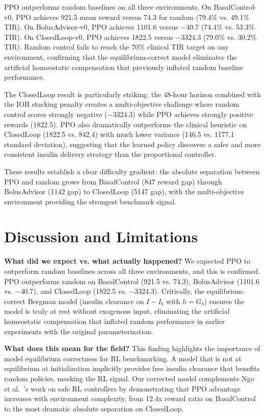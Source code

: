 \documentclass[11pt]{article}
\begin{document}
PPO outperforms random baselines on all three environments. On BasalControl-v0, PPO achieves 921.5 mean reward versus 74.3 for random (79.4\% vs. 49.1\% TIR). On BolusAdvisor-v0, PPO achieves 1101.6 versus $-$40.7 (74.4\% vs. 53.3\% TIR). On ClosedLoop-v0, PPO achieves 1822.5 versus $-$3324.3 (79.0\% vs. 30.2\% TIR). Random control fails to reach the 70\% clinical TIR target on any environment, confirming that the equilibrium-correct model eliminates the artificial homeostatic compensation that previously inflated random baseline performance.

The ClosedLoop result is particularly striking: the 48-hour horizon combined with the IOB stacking penalty creates a multi-objective challenge where random control scores strongly negative ($-$3324.3) while PPO achieves strongly positive rewards (1822.5). PPO also dramatically outperforms the clinical heuristic on ClosedLoop (1822.5 vs. 842.4) with much lower variance (146.5 vs. 1177.1 standard deviation), suggesting that the learned policy discovers a safer and more consistent insulin delivery strategy than the proportional controller.

These results establish a clear difficulty gradient: the absolute separation between PPO and random grows from BasalControl (847 reward gap) through BolusAdvisor (1142 gap) to ClosedLoop (5147 gap), with the multi-objective environment providing the strongest benchmark signal.

\section{Discussion and Limitations}

\textbf{What did we expect vs. what actually happened?}
We expected PPO to outperform random baselines across all three environments, and this is confirmed. PPO outperforms random on BasalControl (921.5 vs. 74.3), BolusAdvisor (1101.6 vs. $-$40.7), and ClosedLoop (1822.5 vs. $-$3324.3). Critically, the equilibrium-correct Bergman model (insulin clearance on $I - I_b$ with $h = G_b$) ensures the model is truly at rest without exogenous input, eliminating the artificial homeostatic compensation that inflated random performance in earlier experiments with the original parameterization.

\textbf{What does this mean for the field?}
This finding highlights the importance of model equilibrium correctness for RL benchmarking. A model that is not at equilibrium at initialization implicitly provides free insulin clearance that benefits random policies, masking the RL signal. Our corrected model complements Ngo et al.~\citep{ngo2025safe}'s work on safe RL controllers by demonstrating that PPO advantage increases with environment complexity, from 12.4x reward ratio on BasalControl to the most dramatic absolute separation on ClosedLoop.
\end{document}
